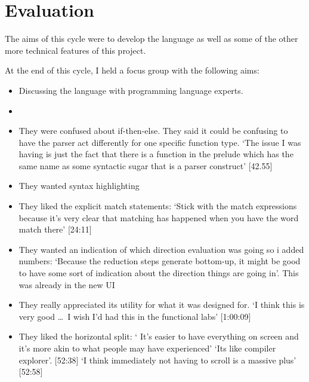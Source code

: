 



\section{Evaluation}
\label{ref:afg_figma}
The aims of this cycle were to develop the language as well as some of the other more technical features of this project. 

At the end of this cycle, I held a focus group with the following aims:

\begin{itemize}
    \item Discussing the language with programming language experts.
    \item 
\end{itemize}

\begin{itemize}
    \item They were confused about if-then-else. They said it could be confusing to have the parser act differently for one specific function type. `The issue I was having is just the fact that there is a function in the prelude which has
    the same name as some syntactic sugar that is a parser construct' [42.55]
    \item They wanted syntax highlighting
    \item They liked the explicit match statements: `Stick with the match expressions because it's very clear that matching has happened when you have the word match there' [24:11]
    \item They wanted an indication of which direction evaluation was going so i added numbers: `Because the reduction steps generate bottom-up,
    it might be good to have some sort of indication about the direction things are going in'. This was already in the new UI
    \item They really appreciated its utility for what it was designed for. `I think this is very good \ldots\ I wish I'd had this in the functional labs' [1:00:09]
\end{itemize}

\begin{itemize}
    \item They liked the horizontal split: ` It's easier to have everything on screen and it's more akin to what people may have experienced' `Its like compiler explorer'. [52:38] `I think immediately not having to scroll is a massive plus' [52:58]
\end{itemize}
